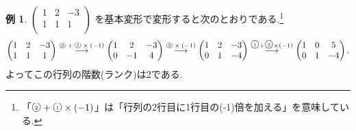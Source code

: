 \documentclass[dvipdfmx,a4paper,11pt]{article}
\newcommand{\maru}[1]{\raise0.2ex\hbox{\textcircled{\tiny{#1}}}}
\theoremstyle{definition}
\newtheorem{exa}[thm]{例}
\begin{document}
\begin{exa}
$
 \begin{pmatrix}
 1& 2& -3  \\
 1& 1& 1  \\
 \end{pmatrix}
 $
 を基本変形で変形すると次のとおりである.\footnote{「$\maru{2} + \maru{1}\times(-1)$」は「行列の2行目に1行目の(-1)倍を加える」を意味している.}
 \begin{align*}
  \begin{pmatrix}
 1& 2& -3  \\
 1& 1& 1  \\
 \end{pmatrix}
 \overset{\text{$\maru{2} + \maru{1}\times(-1)$}}{\longrightarrow} 
   \begin{pmatrix}
 1& 2& -3  \\
 0& -1& 4  \\
 \end{pmatrix}
 \overset{\text{$\maru{2} \times(-1)$}}{\longrightarrow} 
   \begin{pmatrix}
 1& 2& -3  \\
 0& 1& -4  \\
 \end{pmatrix}
  \overset{\maru{1} + \maru{2}\times(-1)}{\longrightarrow} 
   \begin{pmatrix}
 1& 0& 5  \\
 0& 1& -4  \\
 \end{pmatrix}.
  \end{align*}
  よってこの行列の階数(ランク)は2である.
\end{exa}
\end{document}
